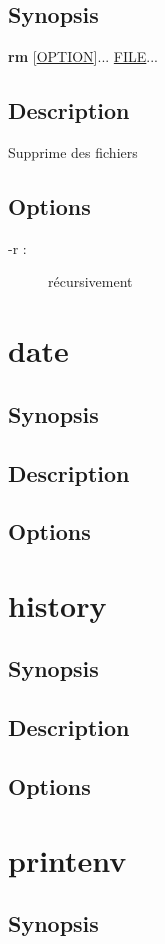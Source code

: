 \documentclass[a4paper, 10pt, onecolumn, openright, oneside]{book}
\begin{document}
			\subsection{Synopsis}
				\textbf{rm} [\ul{OPTION}]... \ul{FILE}...
			\subsection{Description}
				Supprime des fichiers
			\subsection{Options}
				\begin{description}
				\item[-r :] récursivement
				\end{description}
		\section{date}
			\subsection{Synopsis}
			\subsection{Description}
			\subsection{Options}
		\section{history}
			\subsection{Synopsis}
			\subsection{Description}
			\subsection{Options}
		\section{printenv}
			\subsection{Synopsis}
\end{document}
